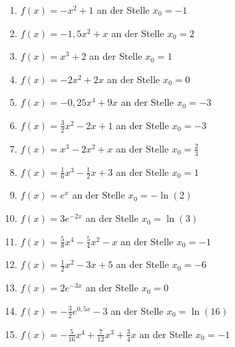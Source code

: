 \begin{Exercise}[title={\raggedright Bestimme jeweils die Normalengleichung.}, label=normaleBestimmenA1]
	\begin{enumerate}[label=\alph*)]
		\item \(f(x)=-x^2+1\) an der Stelle \(x_0=-1\)
		\item \(f(x)=-1,5x^2+x\) an der Stelle \(x_0=2\)
		\item \(f(x)=x^3+2\) an der Stelle \(x_0=1\)
		\item \(f(x)=-2x^2+2x\) an der Stelle \(x_0=0\)
		\item \(f(x)=-0,25x^4+9x\) an der Stelle \(x_0=-3\)
		\item \(f(x)=\frac{3}{2}x^2-2x+1\) an der Stelle \(x_0=-3\)
		\item \(f(x)=x^3-2x^2+x\) an der Stelle \(x_0=\frac{2}{3}\)
		\item \(f(x)=\frac{1}{6}x^3-\frac{1}{2}x+3\) an der Stelle \(x_0=1\)
		\item \(f(x)=e^x\) an der Stelle \(x_0=-\ln(2)\)
		\item \(f(x)=3e^{-2x}\) an der Stelle \(x_0=\ln\left(3\right)\)
		\item \(f(x)=\frac{5}{8}x^4-\frac{5}{4}x^2-x\) an der Stelle \(x_0=-1\)
		\item \(f(x)=\frac{1}{2}x^2-3x+5\) an der Stelle \(x_0=-6\)
		\item \(f(x)=2e^{-3x}\) an der Stelle \(x_0=0\)
		\item \(f(x)=-\frac{3}{2}e^{0,5x}-3\) an der Stelle \(x_0=\ln(16)\)
		\item \(f(x)=-\frac{5}{16}x^4+\frac{7}{12}x^3+\frac{3}{4}x\) an der Stelle \(x_0=-1\)
	\end{enumerate}
\end{Exercise}
